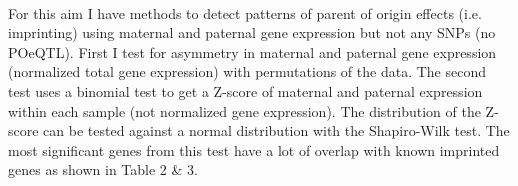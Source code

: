 \documentclass[a4paper, 11pt]{article}
\begin{document}
\\For this aim I have methods to detect patterns of parent of origin effects (i.e. imprinting) using maternal and paternal gene expression but not any SNPs (no POeQTL). First I test for asymmetry in maternal and paternal gene expression (normalized total gene expression) with permutations of the data. The second test uses a binomial test to get a Z-score of maternal and paternal expression within each sample (not normalized gene expression). The distribution of the Z-score can be tested against a normal distribution with the Shapiro-Wilk test. The most significant genes from this test have a lot of overlap with known imprinted genes as shown in Table 2 \& 3. 



\end{document}
